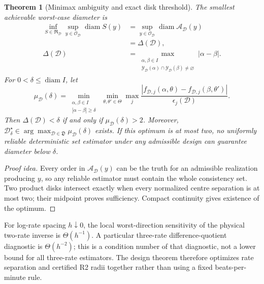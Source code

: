\documentclass[11pt]{article}
\newtheorem{theorem}{Theorem}[section]
\theoremstyle{definition}
\theoremstyle{remark}
\newcommand{\Aset}{\mathcal A}
\newcommand{\Yset}{\mathcal Y}
\newcommand{\diameter}{\operatorname{diam}}
\begin{document}
\begin{theorem}[Minimax ambiguity and exact disk threshold]
\label{thm:design-main}
The smallest achievable worst-case diameter is
\begin{equation}
 \begin{aligned}
  \inf_{S\in\mathfrak R_{\mathcal D}}
  \sup_{y\in\mathcal O_{\mathcal D}}\diameter S(y)
  &=\sup_{y\in\mathcal O_{\mathcal D}}
  \diameter\Aset_{\mathcal D}(y)\\
  &=\Delta(\mathcal D),\\
  \Delta(\mathcal D)
  &=\max_{\substack{\alpha,\beta\in I\\
  \Yset_{\mathcal D}(\alpha)\cap
  \Yset_{\mathcal D}(\beta)\ne\varnothing}}
  |\alpha-\beta|.
 \end{aligned}
 \label{eq:ambiguity-main}
\end{equation}
For $0<\delta\le\diameter I$, let
\[
 \mu_{\mathcal D}(\delta)=
 \min_{\substack{\alpha,\beta\in I\\|\alpha-\beta|\ge\delta}}
 \ \min_{\theta,\theta'\in\Theta}
 \max_j\frac{|f_{\mathcal D,j}(\alpha,\theta)
 -f_{\mathcal D,j}(\beta,\theta')|}{\epsilon_j(\mathcal D)}.
\]
Then $\Delta(\mathcal D)<\delta$ if and only if
$\mu_{\mathcal D}(\delta)>2$.  Moreover,
$\mathcal D^\star_\delta\in
\arg\max_{\mathcal D\in\mathfrak D}\mu_{\mathcal D}(\delta)$ exists.
If this optimum is at most two, no uniformly reliable deterministic set
estimator under any admissible design can guarantee diameter below $\delta$.
\end{theorem}

\begin{proof}[Proof idea]
Every order in $\Aset_{\mathcal D}(y)$ can be the truth for an admissible
realization producing $y$, so any reliable estimator must contain the whole
consistency set.  Two product disks intersect exactly when every normalized
centre separation is at most two; their midpoint proves sufficiency.  Compact
continuity gives existence of the optimum.
\end{proof}

For log-rate spacing $h\downarrow0$, the local worst-direction sensitivity of
the physical two-rate inverse is $\Theta(h^{-1})$.  A particular three-rate
difference-quotient diagnostic is $\Theta(h^{-2})$; this is a condition number
of that diagnostic, not a lower bound for all three-rate estimators.  The
design theorem therefore optimizes rate separation and certified R2 radii
together rather than using a fixed beats-per-minute rule.
\end{document}
